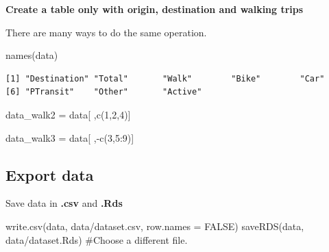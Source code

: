 \documentclass[
  letterpaper,
  DIV=11,
  numbers=noendperiod]{scrreprt}
\newenvironment{Shaded}{\begin{snugshade}}{\end{snugshade}}
\newcommand{\AttributeTok}[1]{\textcolor[rgb]{0.40,0.45,0.13}{#1}}
\newcommand{\CommentTok}[1]{\textcolor[rgb]{0.37,0.37,0.37}{#1}}
\newcommand{\ConstantTok}[1]{\textcolor[rgb]{0.56,0.35,0.01}{#1}}
\newcommand{\DecValTok}[1]{\textcolor[rgb]{0.68,0.00,0.00}{#1}}
\newcommand{\FunctionTok}[1]{\textcolor[rgb]{0.28,0.35,0.67}{#1}}
\newcommand{\NormalTok}[1]{\textcolor[rgb]{0.00,0.23,0.31}{#1}}
\newcommand{\OtherTok}[1]{\textcolor[rgb]{0.00,0.23,0.31}{#1}}
\newcommand{\SpecialCharTok}[1]{\textcolor[rgb]{0.37,0.37,0.37}{#1}}
\newcommand{\StringTok}[1]{\textcolor[rgb]{0.13,0.47,0.30}{#1}}
\begin{document}
\textbf{Create a table only with origin, destination and walking trips}

There are many ways to do the same operation.

\begin{Shaded}
\begin{Highlighting}[]
\FunctionTok{names}\NormalTok{(data)}
\end{Highlighting}
\end{Shaded}

\begin{verbatim}
[1] "Destination" "Total"       "Walk"        "Bike"        "Car"        
[6] "PTransit"    "Other"       "Active"     
\end{verbatim}

\begin{Shaded}
\begin{Highlighting}[]
\NormalTok{data\_walk2 }\OtherTok{=}\NormalTok{ data[ ,}\FunctionTok{c}\NormalTok{(}\DecValTok{1}\NormalTok{,}\DecValTok{2}\NormalTok{,}\DecValTok{4}\NormalTok{)]}
\end{Highlighting}
\end{Shaded}

\begin{Shaded}
\begin{Highlighting}[]
\NormalTok{data\_walk3 }\OtherTok{=}\NormalTok{ data[ ,}\SpecialCharTok{{-}}\FunctionTok{c}\NormalTok{(}\DecValTok{3}\NormalTok{,}\DecValTok{5}\SpecialCharTok{:}\DecValTok{9}\NormalTok{)]}
\end{Highlighting}
\end{Shaded}

\subsection{Export data}\label{export-data}

Save data in \textbf{.csv} and \textbf{.Rds}

\begin{Shaded}
\begin{Highlighting}[]
\FunctionTok{write.csv}\NormalTok{(data, }\StringTok{\textquotesingle{}data/dataset.csv\textquotesingle{}}\NormalTok{, }\AttributeTok{row.names =} \ConstantTok{FALSE}\NormalTok{)}
\FunctionTok{saveRDS}\NormalTok{(data, }\StringTok{\textquotesingle{}data/dataset.Rds\textquotesingle{}}\NormalTok{) }\CommentTok{\#Choose a different file. }
\end{Highlighting}
\end{Shaded}
\end{document}
